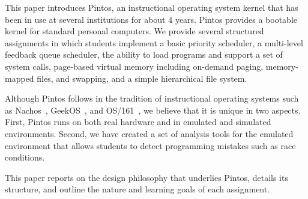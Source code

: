 This paper introduces Pintos, an instructional operating system kernel that 
has been in use at several institutions for about 4 years.  Pintos provides 
a bootable kernel for standard personal computers.  We provide several
structured assignments in which students implement a basic priority
scheduler, a multi-level feedback queue scheduler, the ability to
load programs and support a set of system calls, page-based virtual memory
including on-demand paging, memory-mapped files, and swapping, and a
simple hierarchical file system.  

Although Pintos follows in the tradition of instructional operating systems 
such as Nachos~\cite{Christopher1993Nachos}, 
GeekOS~\cite{Hovemeyer2004Running}, 
and OS/161~\cite{Holland2002New}, we believe that it is unique in two
aspects.  First, Pintos runs on both real hardware and in emulated and
simulated environments.  Second, we have created a set of analysis tools
for the emulated environment that allows students to detect programming
mistakes such as race conditions.

This paper reports on the design philosophy that underlies Pintos,
details its structure, and outline the nature and learning goals of each
assignment.
 
